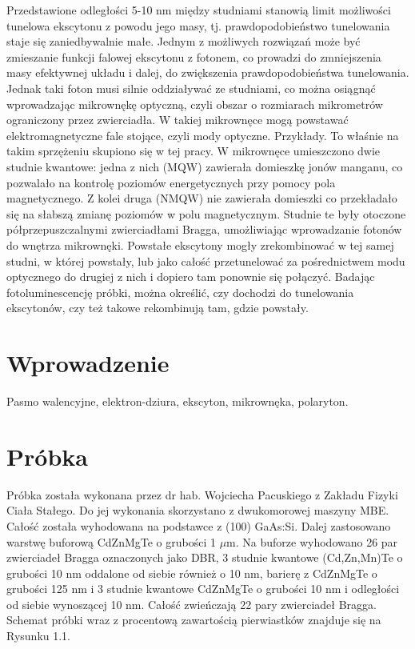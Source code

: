 \documentclass[licencjacka]{pracamgr}
\begin{document}
  Przedstawione odległości 5-10 nm między studniami stanowią limit możliwości tunelowa ekscytonu z powodu jego masy, tj. prawdopodobieństwo tunelowania staje się zaniedbywalnie małe. Jednym z możliwych rozwiązań może być zmieszanie funkcji falowej ekscytonu z fotonem, co prowadzi do zmniejszenia masy efektywnej układu i dalej, do zwiększenia prawdopodobieństwa tunelowania. Jednak taki foton musi silnie oddziaływać ze studniami, co można osiągnąć wprowadzając mikrownękę optyczną, czyli obszar o rozmiarach mikrometrów ograniczony przez zwierciadła. W takiej mikrownęce mogą powstawać elektromagnetyczne fale stojące, czyli mody optyczne. Przykłady.
 To właśnie na takim sprzężeniu skupiono się w tej pracy. W mikrownęce umieszczono dwie studnie kwantowe: jedna z nich (MQW) zawierała domieszkę jonów manganu, co pozwalało na kontrolę poziomów energetycznych przy pomocy pola magnetycznego. Z  kolei druga (NMQW) nie zawierała domieszki co przekładało się na słabszą zmianę poziomów w polu magnetycznym. Studnie te były otoczone półprzepuszczalnymi zwierciadłami Bragga, umożliwiając wprowadzanie fotonów do wnętrza mikrownęki. Powstałe ekscytony mogły zrekombinować w tej samej studni, w której powstały, lub jako całość przetunelować za pośrednictwem modu optycznego do drugiej z nich i dopiero tam ponownie się połączyć. Badając fotoluminescencję próbki, można określić, czy dochodzi do tunelowania ekscytonów, czy też takowe rekombinują tam, gdzie powstały. 
 
 
 \chapter{Wprowadzenie}\label{r:wprow}
 Pasmo walencyjne, elektron-dziura, ekscyton, mikrownęka, polaryton. 
 
 
\chapter{Próbka}\label{r:probka}
Próbka została wykonana przez dr hab. Wojciecha Pacuskiego z Zakładu Fizyki Ciała Stałego. Do jej wykonania skorzystano z dwukomorowej maszyny MBE. Całość została wyhodowana na podstawce z (100) GaAs:Si. Dalej zastosowano warstwę buforową CdZnMgTe o grubości 1 $\mu$m. Na buforze wyhodowano 26 par zwierciadeł Bragga oznaczonych jako DBR, 3 studnie kwantowe (Cd,Zn,Mn)Te o grubości 10 nm oddalone od siebie również o 10 nm, barierę z CdZnMgTe o grubości 125 nm i 3 studnie kwantowe CdZnMgTe o grubości 10 nm i odległości od siebie wynoszącej 10 nm. Całość zwieńczają 22 pary zwierciadeł Bragga. Schemat próbki wraz z procentową zawartością pierwiastków znajduje się na Rysunku 1.1.
\end{document}
